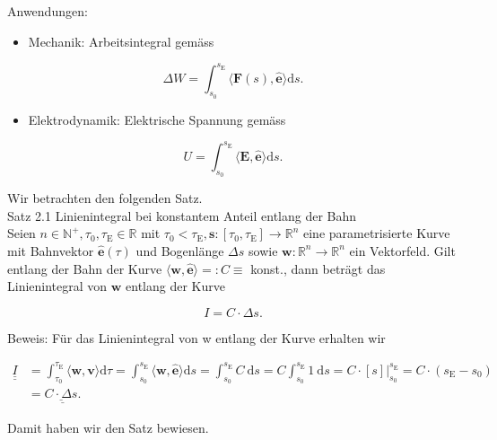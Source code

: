 \documentclass[10pt]{article}
\begin{document}
Anwendungen:

\begin{itemize}
  \item Mechanik: Arbeitsintegral gemäss
\end{itemize}


\begin{equation*}
\Delta W=\int_{s_{0}}^{s_{\mathrm{E}}}\langle\mathbf{F}(s), \hat{\mathbf{e}}\rangle \mathrm{d} s . \tag{2.60}
\end{equation*}


\begin{itemize}
  \item Elektrodynamik: Elektrische Spannung gemäss
\end{itemize}


\begin{equation*}
U=\int_{s_{0}}^{s_{\mathrm{E}}}\langle\mathbf{E}, \hat{\mathbf{e}}\rangle \mathrm{d} s . \tag{2.61}
\end{equation*}


Wir betrachten den folgenden Satz.\\
Satz 2.1 Linienintegral bei konstantem Anteil entlang der Bahn\\
Seien $n \in \mathbb{N}^{+}, \tau_{0}, \tau_{\mathrm{E}} \in \mathbb{R}$ mit $\tau_{0}<\tau_{\mathrm{E}}, \mathbf{s}:\left[\tau_{0}, \tau_{\mathrm{E}}\right] \rightarrow \mathbb{R}^{n}$ eine parametrisierte Kurve mit Bahnvektor $\hat{\mathbf{e}}(\tau)$ und Bogenlänge $\Delta s$ sowie $\mathbf{w}: \mathbb{R}^{n} \rightarrow \mathbb{R}^{n}$ ein Vektorfeld. Gilt entlang der Bahn der Kurve $\langle\mathbf{w}, \widehat{\mathbf{e}}\rangle=: C \equiv$ konst., dann beträgt das Linienintegral von $\mathbf{w}$ entlang der Kurve


\begin{equation*}
I=C \cdot \Delta s . \tag{2.62}
\end{equation*}


Beweis: Für das Linienintegral von w entlang der Kurve erhalten wir


\begin{align*}
\underline{\underline{I}} & =\int_{\tau_{0}}^{\tau_{\mathrm{E}}}\langle\mathbf{w}, \mathbf{v}\rangle \mathrm{d} \tau=\int_{s_{0}}^{s_{\mathrm{E}}}\langle\mathbf{w}, \hat{\mathbf{e}}\rangle \mathrm{d} s=\int_{s_{0}}^{s_{\mathrm{E}}} C \mathrm{~d} s=C \int_{s_{0}}^{s_{\mathrm{E}}} 1 \mathrm{~d} s=\left.C \cdot[s]\right|_{s_{0}} ^{s_{\mathrm{E}}}=C \cdot\left(s_{\mathrm{E}}-s_{0}\right) \\
& =\underline{\underline{C \cdot \Delta s} .} \tag{2.63}
\end{align*}


Damit haben wir den Satz bewiesen.
\end{document}
